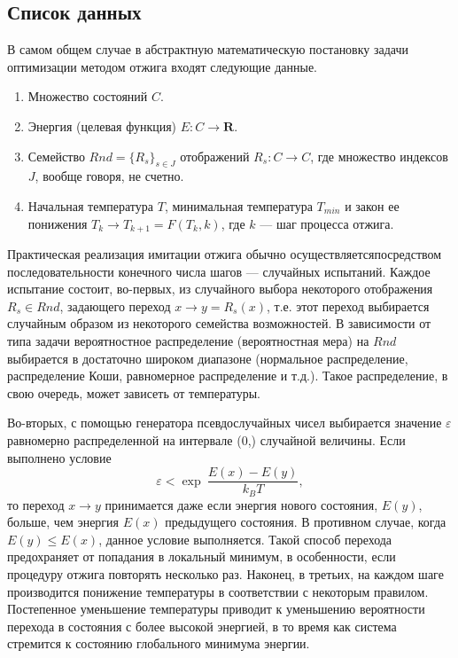 \documentclass[a4paper]{report}
\begin{document}
\subsection{Список данных}%

В самом общем случае в абстрактную математическую постановку задачи оптимизации методом отжига входят следующие данные.
\begin{enumerate}
  \item Множество состояний $C$.
  \item Энергия (целевая функция) $E: C\rightarrow\mathbf{R}$.
  \item Семейство $Rnd=\big\{R_s\big\}_{s\in J}$ отображений $R_s\!:C\rightarrow C$, где множество индексов $J$, вообще говоря, не счетно.
  \item Начальная температура $T$, минимальная температура $T_{min}$ и закон ее понижения  $T_k\rightarrow T_{k+1}=F(T_k,k)$, где $k$ --- шаг процесса отжига.
\end{enumerate}

Практическая реализация имитации отжига обычно осуществляется\linebreak посредством последовательности конечного числа шагов --- случайных испытаний. Каждое испытание состоит, во-первых, из случайного выбора некоторого отображения $R_s\in Rnd$, задающего переход $x\rightarrow y=R_s(x)$, т.е. этот переход выбирается случайным образом из некоторого семейства возможностей. В зависимости от типа задачи вероятностное распределение (вероятностная мера) на $Rnd$ выбирается в достаточно широком диапазоне (нормальное распределение, распределение Коши, равномерное распределение и т.д.). Такое распределение, в свою очередь, может зависеть от температуры.

Во-вторых, с помощью генератора псевдослучайных чисел выбирается значение $\varepsilon$ равномерно распределенной на интервале {(0,)} случайной величины. Если выполнено условие
\begin{equation}\label{prob1}
\varepsilon < \exp\:\!\frac{E(x)-E(y)}{k_B T}, \nonumber
\end{equation}
то переход $x \rightarrow y$ принимается даже если энергия нового состояния, $E(y)$, больше, чем энергия $E(x)$ предыдущего состояния. В противном случае, когда $E(y)\leqslant E(x)$, данное условие выполняется. Такой способ перехода предохраняет от попадания в локальный минимум, в особенности, если процедуру отжига повторять несколько раз. Наконец, в третьих, на каждом шаге производится понижение температуры в соответствии с некоторым правилом. Постепенное уменьшение температуры приводит к уменьшению вероятности перехода в состояния с более высокой энергией, в то время как система стремится к состоянию глобального минимума энергии.
\end{document}
